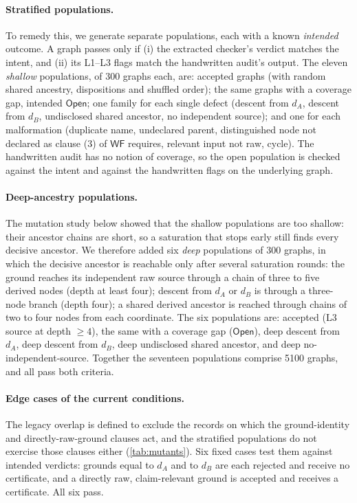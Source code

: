 \paragraph{Stratified populations.}
To remedy this, we generate separate populations, each with a known \emph{intended} outcome. A graph passes only if (i) the extracted checker's verdict matches the intent, and (ii) its L1--L3 flags match the handwritten audit's output. The eleven \emph{shallow} populations, of 300 graphs each, are: accepted graphs (with random shared ancestry, dispositions and shuffled order); the same graphs with a coverage gap, intended $\mathsf{Open}$; one family for each single defect (descent from $d_A$, descent from $d_B$, undisclosed shared ancestor, no independent source); and one for each malformation (duplicate name, undeclared parent, distinguished node not declared as clause (3) of $\mathsf{WF}$ requires, relevant input not raw, cycle). The handwritten audit has no notion of coverage, so the open population is checked against the intent and against the handwritten flags on the underlying graph.

\paragraph{Deep-ancestry populations.}
The mutation study below showed that the shallow populations are too shallow: their ancestor chains are short, so a saturation that stops early still finds every decisive ancestor. We therefore added six \emph{deep} populations of 300 graphs, in which the decisive ancestor is reachable only after several saturation rounds: the ground reaches its independent raw source through a chain of three to five derived nodes (depth at least four); descent from $d_A$ or $d_B$ is through a three-node branch (depth four); a shared derived ancestor is reached through chains of two to four nodes from each coordinate. The six populations are: accepted (L3 source at depth $\ge 4$), the same with a coverage gap ($\mathsf{Open}$), deep descent from $d_A$, deep descent from $d_B$, deep undisclosed shared ancestor, and deep no-independent-source. Together the seventeen populations comprise 5100 graphs, and all pass both criteria.

\paragraph{Edge cases of the current conditions.}
The legacy overlap is defined to exclude the records on which the ground-identity and directly-raw-ground clauses act, and the stratified populations do not exercise those clauses either (\cref{tab:mutants}). Six fixed cases test them against intended verdicts: grounds equal to $d_A$ and to $d_B$ are each rejected and receive no certificate, and a directly raw, claim-relevant ground is accepted and receives a certificate. All six pass.

